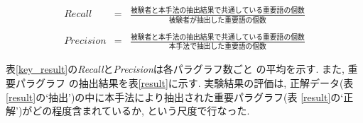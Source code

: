 \vspace*{-1cm}
\begin{eqnarray}
Recall & = & \frac{被験者と本手法の抽出結果で共通している重要語の個数}{被験者が抽出した重要語の個数} \nonumber \\ \nonumber \\
Precision & = & \frac{被験者と本手法の抽出結果で共通している重要語の個数}{本手法で抽出した重要語の個数} \nonumber 
\end{eqnarray}

\noindent
表\ref{key_result}の{\it Recall}と{\it Precision}は各パラグラフ数ごと
の平均を示す.  また, 重要パラグラフ
の抽出結果を表\ref{result}に示す.  実験結果の評価は, 正解データ(表
\ref{result}の`抽出')の中に本手法により抽出された重要パラグラフ(表
\ref{result}の`正解')がどの程度含まれているか, という尺度で行なった.



